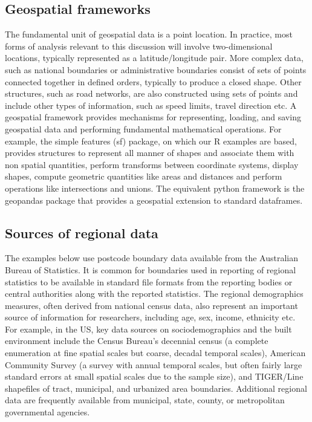 \documentclass[utf8]{frontiersHLTH}
\begin{document}
\subsection{Geospatial frameworks}\label{geospatial-frameworks}

The fundamental unit of geospatial data is a point location. In
practice, most forms of analysis relevant to this discussion will
involve two-dimensional locations, typically represented as a
latitude/longitude pair. More complex data, such as national boundaries
or administrative boundaries consist of sets of points connected
together in defined orders, typically to produce a closed shape. Other
structures, such as road networks, are also constructed using sets of
points and include other types of information, such as speed limits,
travel direction etc. A geospatial framework provides mechanisms for
representing, loading, and saving geospatial data and performing
fundamental mathematical operations. For example, the simple features
(sf) \cite{Pebesma_2018} package, on which our R examples are based,
provides structures to represent all manner of shapes and associate them
with non spatial quantities, perform transforms between coordinate
systems, display shapes, compute geometric quantities like areas and
distances and perform operations like intersections and unions. The
equivalent python framework is the geopandas package that provides a
geospatial extension to standard dataframes.

\subsection{Sources of regional data}\label{sources-of-regional-data}

The examples below use postcode boundary data available from the
Australian Bureau of Statistics. It is common for boundaries used in
reporting of regional statistics to be available in standard file
formats from the reporting bodies or central authorities along with
the reported statistics. The regional demographics measures, often
derived from national census data, also represent an important source
of information for researchers, including age, sex, income, ethnicity
etc.  For example, in the US, key data sources on sociodemographics
and the built environment include the Census Bureau's decennial census
\cite{us_census_bureau_decennial} (a complete enumeration at fine
spatial scales but coarse, decadal temporal scales), American
Community Survey\cite{us_census_bureau_acs} (a survey
with annual temporal scales, but often fairly large standard errors at
small spatial scales due to the sample size), and TIGER/Line
shapefiles\cite{us_census_tiger_line} of tract,
municipal, and urbanized area boundaries. Additional regional data are
frequently available from municipal, state, county, or metropolitan
governmental agencies.
\end{document}
